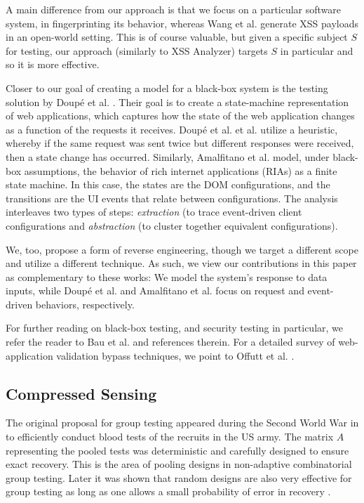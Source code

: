 A main difference from our approach is that we focus on a particular software system, in fingerprinting its behavior, whereas Wang et al. generate XSS payloads in an open-world setting. This is of course valuable, but given a specific subject $S$ for testing, our approach (similarly to XSS Analyzer) targets $S$ in particular and so it is more effective.

Closer to our goal of creating a model for a black-box system is the testing solution by Doup\'e et al. \cite{Doupe:2012}. Their goal is to create a state-machine representation of web applications, which captures
how the state of the web application changes as a function of the requests it receives. Doup\'e et al. et al. utilize a heuristic, whereby if the same request was sent twice but different responses were received, then a state change has occurred. Similarly, Amalfitano et al. \cite{Amalfitano:FT08} model, under black-box assumptions, the behavior of rich internet applications (RIAs) as a finite state machine. In this case, the states are the DOM configurations, and the transitions are the UI events that relate between configurations. The analysis interleaves two types of steps: \emph{extraction} (to trace event-driven client configurations and \emph{abstraction} (to cluster together equivalent configurations).

We, too, propose a form of reverse engineering, though we target a different scope and utilize a different technique. As such, we view our contributions in this paper as complementary to these works: We model the system's response to data inputs, while Doup\'e et al. and Amalfitano et al. focus on request and event-driven behaviors, respectively.

For further reading on black-box testing, and security testing in particular, we refer the reader to Bau et al. \cite{Bau:2010} and references therein. For a detailed survey of web-application validation bypass techniques, we point to Offutt et al. \cite{Offutt1,Offutt2,Offutt3}. 

\subsection{Compressed Sensing}

The original proposal for group testing appeared during the Second World War in \cite{dorfman1943detection}
to efficiently conduct blood tests of the recruits in the US army. The matrix $A$ representing
the pooled tests was deterministic and carefully designed to ensure exact recovery.  This is 
the area of pooling designs in non-adaptive combinatorial group testing.  Later it was shown 
that random designs are also very effective for group testing as long as one allows a small
probability of error in recovery \cite{Malyutov78}.

